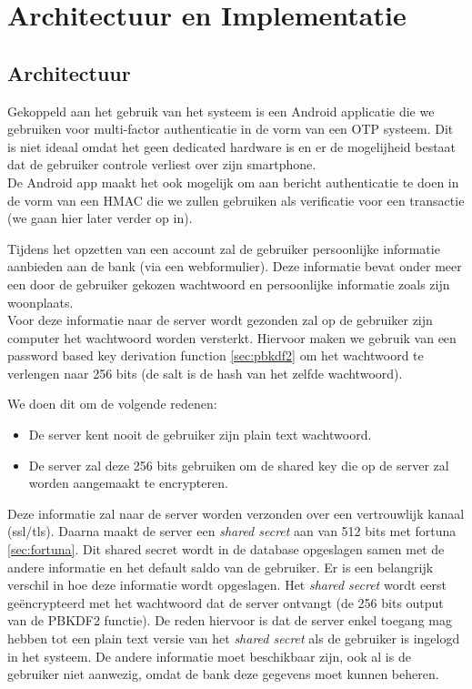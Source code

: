 \documentclass[11pt]{article}
\begin{document}
\section{Architectuur en Implementatie}
\subsection{Architectuur}
Gekoppeld aan het gebruik van het systeem is een Android applicatie die we gebruiken voor multi-factor authenticatie in de vorm van een OTP systeem. Dit is niet ideaal omdat het geen dedicated hardware is en er de mogelijheid bestaat dat de gebruiker controle verliest over zijn smartphone.\\

De Android app maakt het ook mogelijk om aan bericht authenticatie te doen in de vorm van een HMAC die we zullen gebruiken als verificatie voor een transactie (we gaan hier later verder op in).

Tijdens het opzetten van een account zal de gebruiker persoonlijke informatie aanbieden aan de bank (via een webformulier). Deze informatie bevat onder meer een door de gebruiker gekozen wachtwoord en persoonlijke informatie zoals zijn  woonplaats.\\

Voor deze informatie naar de server wordt gezonden zal op de gebruiker zijn computer het wachtwoord worden versterkt. Hiervoor maken we gebruik van een password based key derivation function \ref{sec:pbkdf2}\cite{death_of_clever} om het wachtwoord te verlengen naar 256 bits (de salt is de hash van het zelfde wachtwoord). 

We doen dit om de volgende redenen:
\begin{itemize}
\item De server kent nooit de gebruiker zijn plain text wachtwoord. 
\item De server zal deze 256 bits gebruiken om de shared key die op de server zal worden aangemaakt te encrypteren.
\end{itemize}

Deze informatie zal naar de server worden verzonden over een vertrouwlijk kanaal (ssl/tls). 
Daarna maakt de server een \emph{shared secret} aan van 512 bits met fortuna \ref{sec:fortuna}. Dit shared secret wordt in de database opgeslagen samen met de andere informatie en het default saldo van de gebruiker. Er is een belangrijk verschil in hoe deze informatie wordt opgeslagen. Het \emph{shared secret} wordt eerst ge\"encrypteerd met het wachtwoord dat de server ontvangt (de 256 bits output van de PBKDF2 functie). De reden hiervoor is dat de server enkel toegang mag hebben tot een plain text versie van het \emph{shared secret} als de gebruiker is ingelogd in het systeem. De andere informatie moet beschikbaar zijn, ook al is de gebruiker niet aanwezig, omdat de bank deze gegevens moet kunnen beheren.
\end{document}
